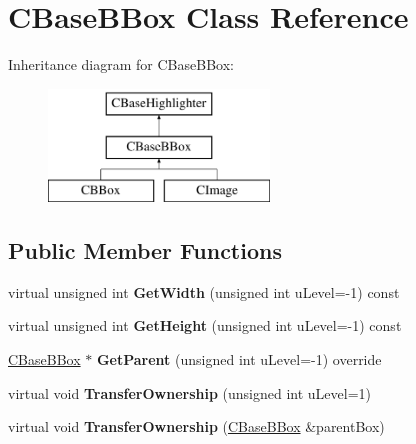 \hypertarget{class_c_base_b_box}{}\section{C\+Base\+B\+Box Class Reference}
\label{class_c_base_b_box}
Inheritance diagram for C\+Base\+B\+Box\+:\begin{figure}[H]
\begin{center}
\leavevmode
\includegraphics[height=3.000000cm]{class_c_base_b_box}
\end{center}
\end{figure}
\subsection*{Public Member Functions}
\begin{DoxyCompactItemize}
\item 
\mbox{\label{class_c_base_b_box_a9e2972e83ca630b10bf61dd5bea2e521}} 
virtual unsigned int {\bfseries Get\+Width} (unsigned int u\+Level=-\/1) const
\item 
\mbox{\label{class_c_base_b_box_ad96488a621c64bb65eb7809b3e882890}} 
virtual unsigned int {\bfseries Get\+Height} (unsigned int u\+Level=-\/1) const
\item 
\mbox{\label{class_c_base_b_box_aa56bf53aae50f5e9bef2356ec34b2e51}} 
\hyperlink{class_c_base_b_box}{C\+Base\+B\+Box} $\ast$ {\bfseries Get\+Parent} (unsigned int u\+Level=-\/1) override
\item 
\mbox{\label{class_c_base_b_box_ae71c6114cb963709bc843c871f51093a}} 
virtual void {\bfseries Transfer\+Ownership} (unsigned int u\+Level=1)
\item 
\mbox{\label{class_c_base_b_box_a5baea44b1a2a9c18f8edddf8d6e1a365}} 
virtual void {\bfseries Transfer\+Ownership} (\hyperlink{class_c_base_b_box}{C\+Base\+B\+Box} \&parent\+Box)
\end{DoxyCompactItemize}
